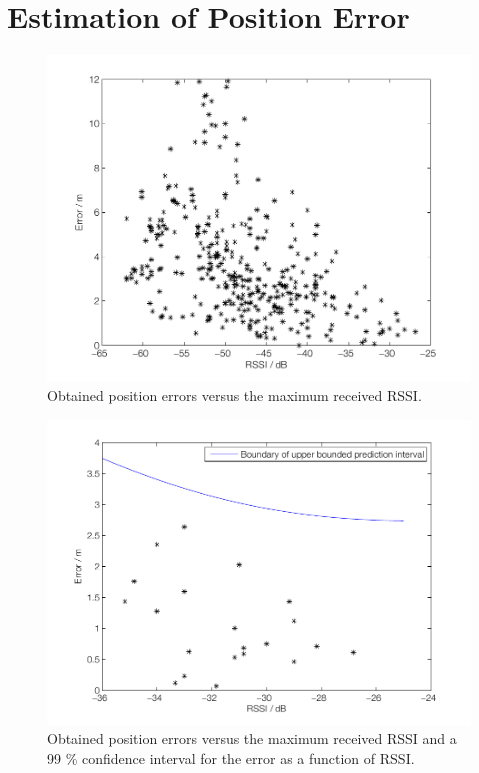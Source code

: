 \documentclass{LTHthesis}
\begin{document}
\section{Estimation of Position Error} %
%
\begin{figure}[!hbt]

\includegraphics[width=1\textwidth ]{images/adapt_parameters/error_vs_maxP_all}
\caption{Obtained position errors versus the maximum received RSSI.}\label{error_vs_maxp_all}
\end{figure}
%
\begin{figure}[!hbt]

\includegraphics[width=1\textwidth ]{images/adapt_parameters/prediction_interval}
\caption{Obtained position errors versus the maximum received RSSI and a 99 \% confidence interval for the error as a function of RSSI.}\label{prediction_interval}
\end{figure}
\end{document}
